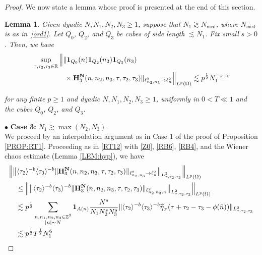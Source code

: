\documentclass[%
11pt,  reqno]{amsart}
\newtheorem{lemma}[theorem]{Lemma}
\DeclareMathOperator{\med}{med}
\newcommand{\1}{\hspace{0.2mm}\text{I}\hspace{0.2mm}}
\newcommand{\noi}{\noindent}
\newcommand{\Z}{\mathbb{Z}}
\newcommand{\R}{\mathbb{R}}
\newcommand{\eps}{\varepsilon}
\newcommand{\ft}{\widehat}
\renewcommand{\l}{\ell}
\renewcommand{\O}{\Omega}
\newcommand{\les}{\lesssim}
\newcommand{\ges}{\gtrsim}
\newcommand{\jb}[1]
{\langle #1 \rangle}
\newcommand{\ind}{\mathbf 1}
\numberwithin{equation}{section}
\numberwithin{theorem}{section}
\newcommand{\Hb}{\mathbf{H}}
\begin{document}
\begin{proof}
We now state a lemma whose proof is presented at the end of this section.


\begin{lemma}\label{LEM:RT3a}
Given dyadic $N, N_1, N_2, N_3 \ge 1$, 
suppose that $N_1 \ges N_{\med}$, where $N_{\med}$ is as in~\eqref{ord1}.
Let $Q_0$, $Q_2$, and $Q_3$
be cubes of side length $\les N_1$.
Fix small $s > 0$.
Then, we have 
\begin{align}
\begin{split}
&  \sup_{\tau,\tau_2,\tau_3\in \R} 
 \Big\| \| 
\ind_{Q_0} (n) \ind_{Q_2} (n_2) \ind_{Q_3} (n_3) \\
&  \hphantom{XXXXX}
\times
\Hb_3^{\bf N}(n,n_2,n_3,\tau,\tau_2,\tau_3) 
 \|_{\l^2_{n_2, n_3} \to \l^2_n} \Big\|_{L^p(\O)}  \les 
p^\frac 12  N_1^{- s + \eps}
\end{split}
\label{RB10}
\end{align}


\noi 
for any finite $p \ge 1$
and  dyadic $N, N_1,  N_2, N_3  \ge 1$, 
uniformly in $0 < T \ll 1$
and the cubes $Q_0$, $Q_2$, and $Q_3$.
\end{lemma}



\medskip

\noi 
$\bullet$ {\bf Case 3:}
$N_1\ges \max(N_2, N_3)$.
\\
\indent
We proceed by an interpolation argument as in Case 1 of the proof of Proposition \ref{PROP:RT1}.
Proceeding as in \eqref{RT12}
with 
\eqref{Z0}, \eqref{RB6}, \eqref{RB4}, and 
the Wiener chaos estimate (Lemma \ref{LEM:hyp}), we have 
\begin{align}
\begin{split}
& \Big\|  
\big\| 
\jb{\tau_2}^{-b} \jb{\tau_3}^{-b}  
\| \Hb_3^{\bf N} (n,n_2,n_3,\tau,\tau_2,\tau_3) \|_{\l^2_{n_2, n_3} \to \l^2_n}  \big\|_{L^2_{\tau,\tau_2,\tau_3}} 
\Big\|_{L^p(\O)} 
\\
& \quad \le
 \Big\|  
\big\| 
\jb{\tau_2}^{-b} \jb{\tau_3}^{-b}  
\| \Hb_3^{\bf N} (n,n_2,n_3,\tau,\tau_2,\tau_3) \|_{\l^2_{n_2, n_3, n}}  \big\|_{L^2_{\tau,\tau_2,\tau_3}} 
\Big\|_{L^p(\O)} \\
&\quad  \les 
p^\frac 12
\sum_{\substack{n,n_1,n_2,n_3 \in \Z^2\\|n|\sim N}} 
\ind_{A(n)}
\frac{N^s}{N_1 N_2^{s} N_3^{s}} 
\| \jb{\tau_2}^{-b} \jb{\tau_3}^{-b}   \ft \eta_{_T} (\tau + \tau_2 - \tau_3 - \phi (\bar n)) \|_{L^2_{\tau,\tau_2,\tau_3}} 
\\
& \quad \les  p^\frac 12 T^\frac 12  N_1^{6}
\end{split}
\label{RB8}
\end{align}



\end{proof}
\end{document}
